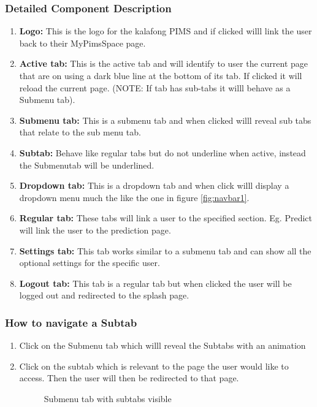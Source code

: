 \documentclass[14pt, a4paper]{article}
\begin{document}
	\subsubsection{Detailed Component Description}
		\begin{enumerate}
			\item \textbf{Logo:} This is the logo for the kalafong PIMS and if clicked willl link the user back to their MyPimsSpace page.
			\item \textbf{Active tab:} This is the active tab and will identify to user the current page that are on using a dark blue line at the bottom of its tab. If clicked it will reload the current page. (NOTE: If tab has sub-tabs it willl behave as a Submenu tab).
			\item \textbf{Submenu tab:} This is a submenu tab and when clicked willl reveal sub tabs that relate to the sub menu tab.
			\item \textbf{Subtab:} Behave like regular tabs but do not underline when active, instead the Submenutab will be underlined.
			\item \textbf{Dropdown tab: } This is a dropdown tab and when click willl display a dropdown menu much the like the one in figure \ref{fig:navbar1}.
			\item \textbf{Regular tab: }  These tabs will link a user to the specified section. Eg. Predict will link the user to the prediction page.
			\item \textbf{Settings tab:} This tab works similar to a submenu tab and can show all the optional settings for the specific user.
			\item \textbf{Logout tab:} This tab is a regular tab but when clicked the user will be logged out and redirected to the splash page.
		\end{enumerate}
	\subsubsection{How to navigate a Subtab}
		\begin{enumerate}
			\item Click on the Submenu tab which willl reveal the Subtabs with an animation
			\item Click on the subtab which is relevant to the page the user would like to access. Then the user will then be redirected to that page.
			\begin{figure}[H]
				\centerline{}
				\caption{Submenu tab with subtabs visible}
  				\label{fig:navbar2}
			\end{figure}
		\end{enumerate}
\end{document}
